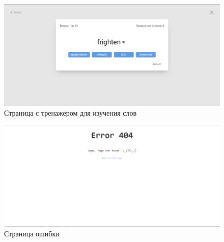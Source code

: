\begin{figure}[h]
	\centering
	\includegraphics[width=\textwidth]{figures/trainer}
	\caption{Страница с тренажером для изучения слов}
	\label{fig:trainer}
\end{figure}

\begin{figure}[h]
	\centering
	\includegraphics[width=\textwidth]{figures/404}
	\caption{Страница ошибки}
	\label{fig:404}
\end{figure}

